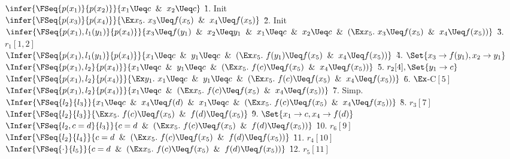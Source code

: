 \begin{example}
\begin{itemize}
    \renewcommand{\Sa}{x_1\Ueq c\And x_2\Ueq c}
    \renewcommand{\Qa}{\infer{\FSeq{p(x_1)}{p(x_2)}}{\Sa}}

    \renewcommand{\Sb}{\Ex x_5.~x_3\Ueq f(x_5)\And x_4\Ueq f(x_5)}
    \renewcommand{\Qb}{\infer{\FSeq{p(x_3)}{p(x_4)}}{\Sb}}

    \renewcommand{\Sc}{x_3\Ueq f(y_1)\And x_2 \Ueq  y_1\And \Sa\And (\Sb)}
    \renewcommand{\Qc}{\infer{\FSeq{p(x_1),l_1(y_1)}{p(x_4)}}{\Sc}}

    \renewcommand{\Sd}{x_1\Ueq c\And y_1\Ueq c \And (\Ex x_5.~f(y_1)\Ueq f(x_5)\And x_4\Ueq f(x_5))}
    \renewcommand{\Qd}{\Infer{\FSeq{p(x_1),l_1(y_1)}{p(x_4)}}{\Sd}}

    \renewcommand{\Se}{x_1\Ueq c\And y_1\Ueq c \And (\Ex x_5.~f(c)\Ueq f(x_5)\And x_4\Ueq f(x_5))}
    \renewcommand{\Qe}{\Infer{\FSeq{p(x_1),l_2}{p(x_4)}}{\Se}}

    \renewcommand{\Sf}{\Ex y_1.~x_1\Ueq c\And y_1\Ueq c \And (\Ex x_5.~f(c)\Ueq f(x_5)\And x_4\Ueq f(x_5))}
    \renewcommand{\Qf}{\Infer{\FSeq{p(x_1),l_2}{p(x_4)}}{\Sf}}

    \renewcommand{\Sg}{x_1\Ueq c\And (\Ex x_5.~f(c)\Ueq f(x_5)\And x_4\Ueq f(x_5))}
    \renewcommand{\Qg}{\Infer{\FSeq{p(x_1),l_2}{p(x_4)}}{\Sg}}

    \renewcommand{\Sh}{x_1\Ueq c\And x_4\Ueq f(d)\And x_1\Ueq c\And (\Ex x_5.~f(c)\Ueq f(x_5)\And x_4\Ueq f(x_5))}
    \renewcommand{\Qh}{\Infer{\FSeq{l_2}{l_3}}{\Sh}}

    \renewcommand{\Si}{\Ex x_5.~f(c)\Ueq f(x_5)\And f(d)\Ueq f(x_5)}
    \renewcommand{\Qi}{\Infer{\FSeq{l_2}{l_3}}{\Si}}

    \renewcommand{\Sj}{c=d\And(\Ex x_5.~f(c)\Ueq f(x_5)\And f(d)\Ueq f(x_5))}
    \renewcommand{\Qj}{\Infer{\FSeq{l_2,c=d}{l_3}}{\Sj}}

    \renewcommand{\Sk}{c=d\And(\Ex x_5.~f(c)\Ueq f(x_5)\And f(d)\Ueq f(x_5))}
    \renewcommand{\Qk}{\Infer{\FSeq{l_2}{l_4}}{\Sk}}

    \renewcommand{\Sl}{c=d\And(\Ex x_5.~f(c)\Ueq f(x_5)\And f(d)\Ueq f(x_5))}
    \renewcommand{\Ql}{\Infer{\FSeq{\cdot}{l_5}}{\Sl}}

    \begin{tabbing}
    $\Qa$ \` 1. Init\\[1em]
    $\Qb$ \` 2. Init\\[1em]
    $\Qc$ \` 3. $r_1[1, 2]$\\[1em]
    $\Qd$ \` 4. $\Set{x_3\to f(y_1),x_2\to y_1}$\\[1em]
    $\Qe$ \` 5. $r_2[4], \Set{y_1\to c}$\\[1em]
    $\Qf$ \` 6. $\Ex$-C$[5]$\\[1em]
    $\Qg$ \` 7. Simp.\\[1em]
    $\Qh$ \` 8. $r_3[7]$\\[1em]
    $\Qi$ \` 9. $\Set{x_1\to c,x_4\to f(d)}$\\[1em]
    $\Qj$ \` 10. $r_6[9]$\\[1em]
    $\Qk$ \` 11. $r_4[10]$\\[1em]
    $\Ql$ \` 12. $r_5[11]$\\[1em]
    \end{tabbing}
  \end{itemize}


\end{example}

